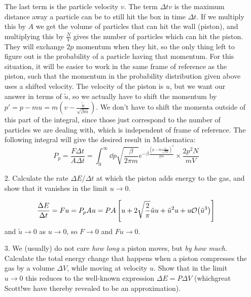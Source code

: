 \documentclass[a4paper,twoside]{article}
\begin{document}
\begin{itemize}
\begin{problem}
            The last term is the particle velocity $ v $. The term $ \Delta t v $ is the maximum distance away a particle can be to still hit the box in time $ \Delta t $. If we multiply this by $ A $ we get the volume of particles that can hit the wall (piston), and multiplying this by $ \frac{N}{V} $ gives the number of particles which can hit the piston. They will exchange $ 2 p $ momentum when they hit, so the only thing left to figure out is the probability of a particle having that momentum. For this situation, it will be easier to work in the same frame of reference as the piston, such that the momentum in the probability distribution given above uses a shifted velocity. The velocity of the piston is $ u $, but we want our answer in terms of $ \tilde{u} $, so we actually have to shift the momentum by $ p' = p - mu = m\left( v - \frac{\tilde{u}}{\sqrt{\beta m}} \right) $. We don't have to shift the momenta outside of this part of the integral, since those just correspond to the number of particles we are dealing with, which is independent of frame of reference. The following integral will give the desired result in Mathematica:
            \begin{equation}
                P_p = \frac{F \Delta t}{A \Delta t} = \int_0^{\infty} \dd{p} \sqrt{\frac{\beta}{2 \pi m}} e^{- \beta \frac{\left( p - m \frac{\tilde{u}}{\sqrt{\beta m}} \right)^2}{2m}} \times \frac{2 p^2 N}{mV}
            \end{equation}
        \end{problem}
    \item[2.] Calculate the rate $ \Delta E / \Delta t $ at which the piston adds energy to the gas, and show that it vanishes in the limit $ u \to 0 $.
        \begin{problem}
            \begin{equation}
                \frac{\Delta E}{\Delta t} = Fu = P_p A u = PA \left[ u + 2 \sqrt{\frac{2}{\pi}} \tilde{u} u + \tilde{u}^2 u + u \order{\tilde{u}^3} \right]
            \end{equation}
            and $ \tilde{u} \to 0 $ as $ u \to 0 $, so $ F \to 0 $ and $ F u \to 0 $.
        \end{problem}
    \item[3.] We (usually) do not care \textit{how long} a piston moves, but \textit{by how much}. Calculate the total energy change that happens when a piston compresses the gas by a volume $ \Delta V $, while moving at velocity $ u $. Show that in the limit $ u \to 0 $ this reduces to the well-known expression $ \Delta E = P \Delta V $ (which\textemdash great Scott!\textemdash we have thereby revealed to be an approximation).

\end{itemize}
\end{document}
